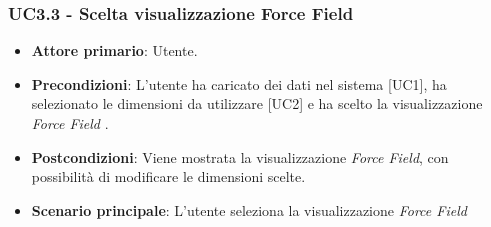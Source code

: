 \subsubsection{UC3.3 - Scelta visualizzazione Force Field}
\begin{itemize}
	\item \textbf{Attore primario}: Utente.
	\item \textbf{Precondizioni}: L'utente ha caricato dei dati nel sistema [UC1], ha selezionato le dimensioni da utilizzare [UC2] e ha scelto la visualizzazione \textit{Force Field} .
	\item \textbf{Postcondizioni}: Viene mostrata la visualizzazione \textit{Force Field}, con possibilità di modificare le dimensioni scelte.
	\item \textbf{Scenario principale}: L'utente seleziona la visualizzazione \textit{Force Field}
\end{itemize}